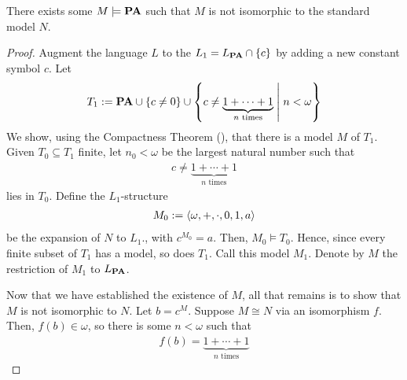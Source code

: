 \begin{boxtheorem}
    There exists some $M\models \mathbf{PA}$ such that $M$ is not isomorphic to the standard model $N$.
\end{boxtheorem}
\begin{proof}
    Augment the language $L$ to the $L_1 = L_{\mathbf{PA}} \cap \left\{ c \right\}$ by adding a new constant symbol $c$. Let
    \begin{align*}
        T_1 := \mathbf{PA} \cup \left\{ c \neq 0 \right\} \cup \left\{ c \neq \underbrace{1 + \cdots + 1}_{n \text{ times}} \; \middle\vert \; n < \omega \right\}
    \end{align*}
    We show, using the Compactness Theorem (\sorry), that there is a model $M$ of $T_1$. Given $T_0 \subseteq T_1$ finite, let $n_0 < \omega$ be the largest natural number such that
    \begin{align*}
        c \neq \underbrace{1 + \cdots + 1}_{n \text{ times}}
    \end{align*}
    lies in $T_0$. Define the $L_1$-structure
    \begin{align*}
        M_0 := \left\langle \omega, +, \cdot, 0, 1, a \right\rangle
    \end{align*}
    be the expansion of $N$ to $L_1$., with $c^{M_0} = a$. Then, $M_0 \models T_0$. Hence, since every finite subset of $T_1$ has a model, so does $T_1$. Call this model $M_1$. Denote by $M$ the restriction of $M_1$ to $L_{\mathbf{PA}}$.

    Now that we have established the existence of $M$, all that remains is to show that $M$ is not isomorphic to $N$. Let $b = c^M$. Suppose $M \cong N$ via an isomorphism $f$. Then, $f(b) \in \omega$, so there is some $n < \omega$ such that
    \begin{align*}
        f(b) = \underbrace{1 + \cdots + 1}_{n \text{ times}}
    \end{align*}
   
\end{proof} %



